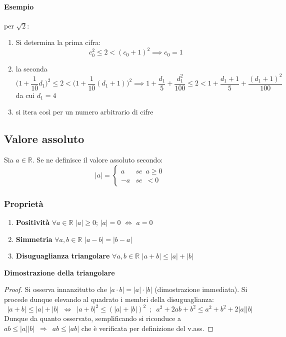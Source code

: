 \documentclass[10pt]{article}
\theoremstyle{plain}
\begin{document}
\paragraph{Esempio} per $\sqrt{2}$:
\begin{enumerate}
\item Si determina la prima cifra:
\[c_0^2 \leq 2 < (c_0 + 1)^2 \implies c_0 = 1\]
\item la seconda
\[\big(1 + \frac{1}{10}d_1\big)^2 \leq 2 < \big(1 + \frac{1}{10}(d_1+1)\big)^2 \implies 1 + \frac{d_1}{5} + \frac{d_1^2}{100} \leq 2 < 1 + \frac{d_1+1}{5} + \frac{(d_1+1)^2}{100}\]
da cui $d_1 = 4$
\item si itera così per un numero arbitrario di cifre
\end{enumerate}

\subsection{Valore assoluto}
\begin{defin}
    Sia $a \in \mathbb{R}$. Se ne definisce il valore assoluto secondo:
    \[|a| = \begin{cases}
        a & se \enspace a \geq 0\\
        -a & se \enspace < 0 
    \end{cases}\]
\end{defin}
\subsubsection*{Proprietà}
\begin{enumerate}
    \item \textbf{Positività} $\forall a \in \mathbb{R}$ $|a| \geq 0$; $|a| = 0$ $\Leftrightarrow$ $a = 0$
    \item \textbf{Simmetria} $\forall a,b \in \mathbb{R}$ $|a - b| = |b - a|$
    \item \textbf{Disuguaglianza triangolare} $\forall a,b \in \mathbb{R}$ $|a+b| \leq |a| + |b|$
\end{enumerate}
\textbf{Dimostrazione della triangolare}
\begin{proof}
    Si osserva innanzitutto che $|a \cdot b| = |a| \cdot |b|$ (dimostrazione immediata). Si procede dunque elevando al quadrato i membri della disuguaglianza:
    \[|a+b| \leq |a| + |b| \enspace \Leftrightarrow \enspace |a + b|^2 \leq (|a| + |b|)^2 \enspace ; \enspace a^2 +2ab + b^2 \leq a^2 + b^2 + 2 |a| |b|\]
    Dunque da quanto osservato, semplificando si riconduce a $ab \leq |a||b| \enspace \Rightarrow \enspace ab \leq |ab|$ che è verificata per definizione del v.ass.
\end{proof}
\end{document}
